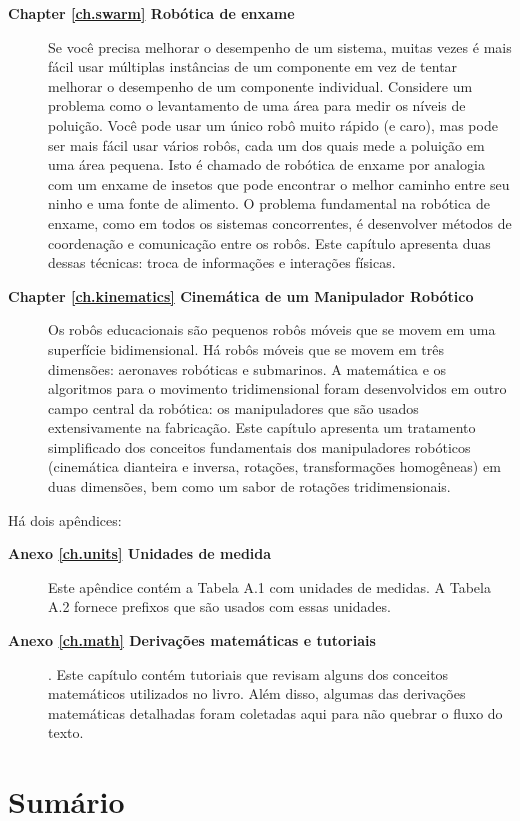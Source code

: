 \begin{description}
\item [\textbf{Chapter \ref{ch.swarm} Robótica de enxame}] Se você precisa melhorar o desempenho de um sistema, muitas vezes é mais fácil usar múltiplas instâncias de um componente em vez de tentar melhorar o desempenho de um componente individual. Considere um problema como o levantamento de uma área para medir os níveis de poluição. Você pode usar um único robô muito rápido (e caro), mas pode ser mais fácil usar vários robôs, cada um dos quais mede a poluição em uma área pequena. Isto é chamado de robótica de enxame por analogia com um enxame de insetos que pode encontrar o melhor caminho entre seu ninho e uma fonte de alimento. O problema fundamental na robótica de enxame, como em todos os sistemas concorrentes, é desenvolver métodos de coordenação e comunicação entre os robôs. Este capítulo apresenta duas dessas técnicas: troca de informações e interações físicas.

\item [\textbf{Chapter \ref{ch.kinematics} Cinemática de um Manipulador Robótico}] Os robôs educacionais são pequenos robôs móveis que se movem em uma superfície bidimensional. Há robôs móveis que se movem em três dimensões: aeronaves robóticas e submarinos. A matemática e os algoritmos para o movimento tridimensional foram desenvolvidos em outro campo central da robótica: os manipuladores que são usados extensivamente na fabricação. Este capítulo apresenta um tratamento simplificado dos conceitos fundamentais dos manipuladores robóticos (cinemática dianteira e inversa, rotações, transformações homogêneas) em duas dimensões, bem como um sabor de rotações tridimensionais.
\end{description}

Há dois apêndices:
\begin{description}
\item [\textbf{Anexo \ref{ch.units} Unidades de medida}] Este apêndice contém a Tabela A.1 com unidades de medidas. A Tabela A.2 fornece prefixos que são usados com essas unidades.

\item [\textbf{Anexo \ref{ch.math} Derivações matemáticas e tutoriais}]. Este capítulo contém tutoriais que revisam alguns dos conceitos matemáticos utilizados no livro. Além disso, algumas das derivações matemáticas detalhadas foram coletadas aqui para não quebrar o fluxo do texto.
\end{description}

\section{Sumário}

